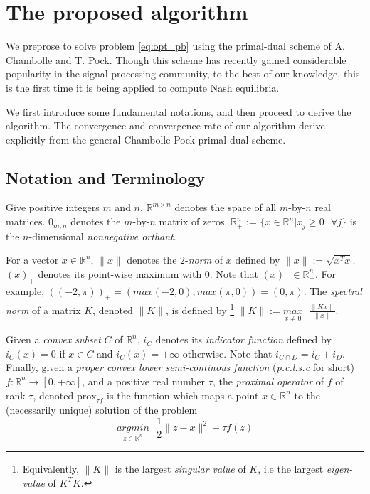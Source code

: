 \documentclass[a4paper,9pt,journal]{IEEEtran}
\begin{document}



\section{The proposed algorithm}
We preprose to solve problem \eqref{eq:opt_pb} using the primal-dual scheme of A. Chambolle and T. Pock.
Though this scheme has recently gained considerable popularity in the signal processing community, to the best of our knowledge,
this is the first time it is being applied to compute Nash equilibria.

We first introduce some fundamental notations, and then proceed to derive the algorithm. The convergence and convergence rate
of our algorithm derive explicitly from the general Chambolle-Pock primal-dual scheme.

\subsection{Notation and Terminology}
Give positive integers $m$ and $n$, $\mathbb{R}^{m \times n}$ denotes
the space of all $m$-by-$n$ real matrices. $0_{m,n}$ denotes the $m$-by-$n$ matrix of zeros.
$\mathbb{R}^n_+$ := $\{x \in \mathbb{R}^n|x_j \ge 0 \text{ }  \forall j\}$ is the $n$-dimensional \textit{nonnegative orthant}.

For a vector $x \in \mathbb{R}^n$, $\|x\|$ denotes the $2$-\textit{norm} of $x$ defined by $\|x\| := \sqrt{x^Tx}$.
$(x)_+$ denotes its point-wise maximum with 0. Note that $(x)_+ \in \mathbb{R}^n_+$.
For example, $((-2, \pi))_+ = (max(-2, 0), max(\pi, 0)) = (0, \pi)$. The \textit{spectral norm} of a matrix $K$, denoted $\|K\|$, is defined by
\footnote{Equivalently, $\|K\|$ is the largest \textit{singular value} of $K$, i.e the largest \textit{eigen-value} of $K^TK$.}
$\|K\| := \underset{x \ne 0}{max}\text{ }\frac{\|Kx\|}{\|x\|}$.

Given a \textit{convex subset} $C$ of $\mathbb{R}^n$, $i_C$ denotes its \textit{indicator function} defined by
$i_C(x) = 0$ if $x \in C$ and $i_C(x) = +\infty$ otherwise. Note that $i_{C \cap D} = i_C + i_D$. Finally, given a \textit{proper convex lower semi-continous
function} (\textit{p.c.l.s.c} for short) $f : \mathbb{R}^n \rightarrow [0, +\infty]$, and a positive real number $\tau$, the \textit{proximal operator} of $f$ of rank $\tau$,
denoted $\text{prox}_{\tau f}$ is the function which maps a point $x \in \mathbb{R}^n$ to the (necessarily unique) solution of the problem
\begin{equation}
  \underset{z \in \mathbb{R}^n}{argmin}\text{ }\frac{1}{2}\|z - x\|^2 + \tau f(z)
\end{equation}
\end{document}
